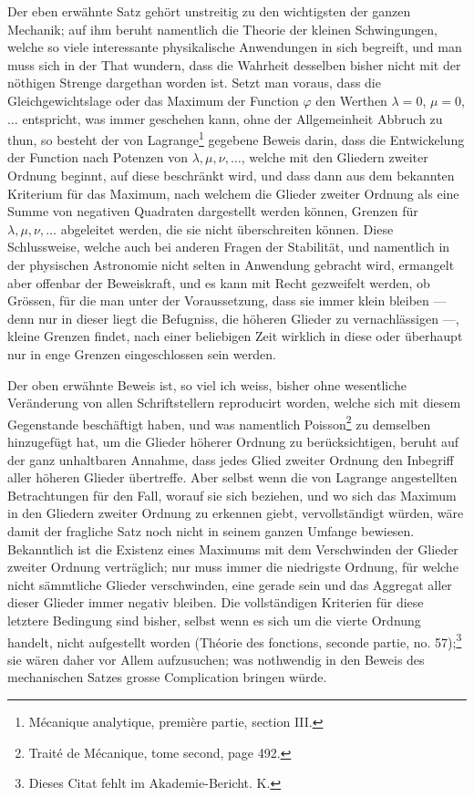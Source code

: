 \documentclass[11pt]{article}
\begin{document}
Der eben erwähnte Satz gehört unstreitig zu den wichtigsten der ganzen Mechanik; auf ihm beruht namentlich die Theorie der kleinen Schwingungen, welche so viele interessante physikalische Anwendungen in sich begreift, und man muss sich in der That wundern, dass die Wahrheit desselben bisher nicht mit der nöthigen Strenge dargethan worden ist. Setzt man voraus, dass die Gleichgewichtslage oder das Maximum der Function $\varphi$ den Werthen $\lambda=0$, $\mu=0$, $\ldots$ entspricht, was immer geschehen kann, ohne der Allgemeinheit Abbruch zu thun, so besteht der von Lagrange\footnote{Mécanique analytique, première partie, section III.} gegebene Beweis darin, dass die Entwickelung der Function nach Potenzen von $\lambda,\mu,\nu,\ldots$, welche mit den Gliedern zweiter Ordnung beginnt, auf diese beschränkt wird, und dass dann aus dem bekannten Kriterium für das Maximum, nach welchem die Glieder zweiter Ordnung als eine Summe von negativen Quadraten dargestellt werden können, Grenzen für $\lambda,\mu,\nu,\ldots$ abgeleitet werden, die sie nicht überschreiten können. Diese Schlussweise, welche auch bei anderen Fragen der Stabilität, und namentlich in der physischen Astronomie nicht selten in Anwendung gebracht wird, ermangelt aber offenbar der Beweiskraft, und es kann mit Recht gezweifelt werden, ob Grössen, für die man unter der Voraussetzung, dass sie immer klein bleiben --- denn nur in dieser liegt die Befugniss, die höheren Glieder zu vernachlässigen ---, kleine Grenzen findet, nach einer beliebigen Zeit wirklich in diese oder überhaupt nur in enge Grenzen eingeschlossen sein werden.

Der oben erwähnte Beweis ist, so viel ich weiss, bisher ohne wesentliche Veränderung von allen Schriftstellern reproducirt worden, welche sich mit diesem Gegenstande beschäftigt haben, und was namentlich Poisson\footnote{Traité de Mécanique, tome second, page 492.} zu demselben hinzugefügt hat, um die Glieder höherer Ordnung zu berücksichtigen, beruht auf der ganz unhaltbaren Annahme, dass jedes Glied zweiter Ordnung den Inbegriff aller höheren Glieder übertreffe. Aber selbst wenn die von Lagrange angestellten Betrachtungen für den Fall, worauf sie sich beziehen, und wo sich das Maximum in den Gliedern zweiter Ordnung zu erkennen giebt, vervollständigt würden, wäre damit der fragliche Satz noch nicht in seinem ganzen Umfange bewiesen. Bekanntlich ist die Existenz eines Maximums mit dem Verschwinden der Glieder zweiter Ordnung verträglich; nur muss immer die niedrigste Ordnung, für welche nicht sämmtliche Glieder verschwinden, eine gerade sein und das Aggregat aller dieser Glieder immer negativ bleiben. Die vollständigen Kriterien für diese letztere Bedingung sind bisher, selbst wenn es sich um die vierte Ordnung handelt, nicht aufgestellt worden (Théorie des fonctions, seconde partie, no. 57);\footnote{Dieses Citat fehlt im Akademie-Bericht. K.} sie wären daher vor Allem aufzusuchen; was nothwendig in den Beweis des mechanischen Satzes grosse Complication bringen würde.
\end{document}
